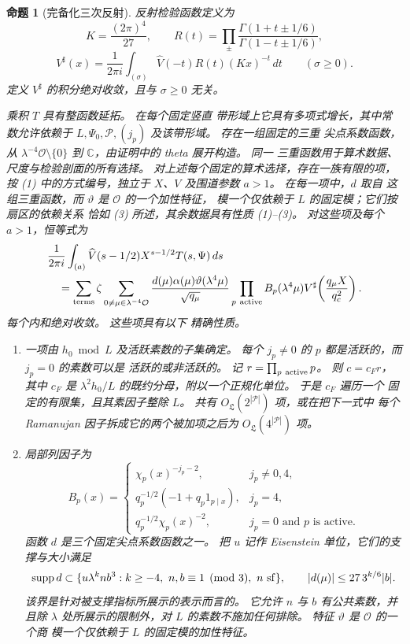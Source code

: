 \documentclass[11pt,a4paper]{article}
\numberwithin{equation}{section}
\numberwithin{figure}{section}
\newtheorem{proposition}[theorem]{命题}
\theoremstyle{definition}
\theoremstyle{remark}
\begin{document}
\begin{proposition}[完备化三次反射]
反射检验函数定义为
\[
 K=\frac{(2\pi)^4}{27},\qquad
 R(t)=\prod_{\pm}\frac{\Gamma(1+t\pm1/6)}{\Gamma(1-t\pm1/6)},
\]
\[
 V^\sharp(x)=\frac1{2\pi i}\int_{(\sigma)}
       \widehat V(-t)R(t)(Kx)^{-t}\,dt\qquad(\sigma\ge0).
\]
定义 $V^\sharp$ 的积分绝对收敛，且与 $\sigma\ge0$ 无关。

乘积 $T$ 具有整函数延拓。 在每个固定竖直
带形域上它具有多项式增长，其中常数允许依赖于
$L,\Psi_0,\mathcal P,(j_p)$ 及该带形域。 存在一组固定的三重
尖点系数函数，从 $\lambda^{-4}\mathcal O\setminus\{0\}$ 到
$\mathbb C$，由证明中的 theta 展开构造。 同一
三重函数用于算术数据、尺度与检验剖面的所有选择。
对上述每个固定的算术选择，存在一族有限的项，
按 (1) 中的方式编号，独立于
$X$、$V$ 及围道参数 $a>1$。 在每一项中，$d$ 取自
这组三重函数，而 $\vartheta$ 是 $\mathcal O$ 的一个加性特征，
模一个仅依赖于 $L$ 的固定模；它们按扇区的依赖关系
恰如 (3) 所述，其余数据具有性质 (1)--(3)。
对这些项及每个 $a>1$，恒等式为
\begin{equation}\label{eq:reflection}
 \begin{aligned}
 &\frac1{2\pi i}\int_{(a)}\widehat V(s-1/2)X^{s-1/2}T(s,\Psi)\,ds\\
 &\quad=\sum_{\text{terms}}\zeta
 \sum_{0\ne\mu\in\lambda^{-4}\mathcal O}
 \frac{d(\mu)\alpha(\mu)\vartheta(\lambda^4\mu)}{\sqrt{q_\mu}}
 \prod_{p\ {\rm active}}B_p(\lambda^4\mu)
 V^\sharp\!\left(\frac{q_\mu X}{q_c^2}\right).
 \end{aligned}
\end{equation}
每个内和绝对收敛。 这些项具有以下
精确性质。

\begin{enumerate}
\item 一项由 $h_0\bmod L$ 及活跃素数的子集确定。
每个 $j_p\ne0$ 的 $p$ 都是活跃的，而 $j_p=0$ 的素数可以是
活跃的或非活跃的。 记 $r=\prod_{p\ {\rm active}}p$。 则
$c=c_Fr$，其中 $c_F$ 是
$\lambda^2h_0/L$ 的既约分母，附以一个正规化单位。 于是 $c_F$ 遍历一个
固定的有限集，且其素因子整除 $L$。 共有
$O_{\mathfrak L}(2^{|\mathcal P|})$ 项，或在把下一式中
每个 Ramanujan 因子拆成它的两个被加项之后为
$O_{\mathfrak L}(4^{|\mathcal P|})$ 项。

\item 局部列因子为
\[
 B_p(x)=\begin{cases}
 \chi_p(x)^{-j_p-2},&j_p\ne0,4,\\
 q_p^{-1/2}(-1+q_p1_{p\mid x}),&j_p=4,\\
 q_p^{-1/2}\chi_p(x)^{-2},&j_p=0\text{ and }p\text{ is active}.
 \end{cases}
\]
函数 $d$ 是三个固定尖点系数函数之一。
把 $u$ 记作 Eisenstein 单位，它们的支撑与大小满足
\begin{equation}
 \operatorname{supp}d\subset
 \{u\lambda^k n b^3:k\ge-4,\ n,b\equiv1\pmod3,\ n\ {\rm sf}\},
 \qquad |d(\mu)|\le27\,3^{k/6}|b|.
 \label{old-eq:4.3}
\end{equation}
该界是针对被支撑指标所展示的表示而言的。
它允许 $n$ 与 $b$ 有公共素数，并且除
$\lambda$ 处所展示的限制外，对 $L$ 的素数不施加任何排除。
特征 $\vartheta$ 是 $\mathcal O$ 的一个商
模一个仅依赖于 $L$ 的固定模的加性特征。


\end{enumerate}
\end{proposition}
\end{document}
